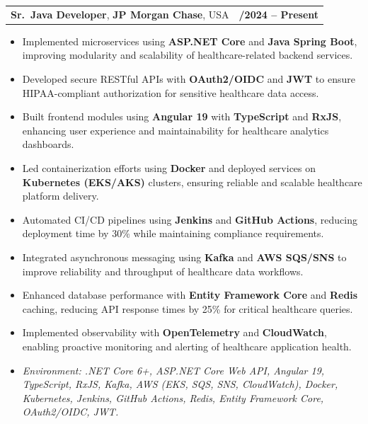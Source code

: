 \documentclass[letterpaper,11pt]{article}
\makeatletter
\newcommand{\resumeItem}[1]{
  \item\footnotesize{
    {#1 \vspace{-2pt}}
  }
}
\newcommand{\resumeSubheading}[4]{
  \vspace{-2pt}\item
    \begin{tabular*}{1.0\textwidth}[t]{l@{\extracolsep{\fill}}r}
      \textbf{\fontsize{10pt}{14pt}\selectfont #3}, \textbf{\fontsize{10pt}{14pt}\selectfont #1}, \fontsize{10pt}{14pt}\selectfont #4 & \textbf{\fontsize{10pt}{14pt}\selectfont #2} \\
    \end{tabular*}\vspace{-7pt}
}
\newcommand{\resumeItemListStart}{\begin{itemize}[leftmargin=*]}
\newcommand{\resumeItemListEnd}{\end{itemize}\vspace{-5pt}}
\makeatother
\begin{document}
\resumeSubheading
{JP Morgan Chase}{09/2024 -- Present}
{Sr.\ Java Developer}{USA}
\resumeItemListStart
  \resumeItem{Implemented microservices using \textbf{ASP.NET Core} and \textbf{Java Spring Boot}, improving modularity and scalability of healthcare-related backend services.}
  \resumeItem{Developed secure RESTful APIs with \textbf{OAuth2/OIDC} and \textbf{JWT} to ensure HIPAA-compliant authorization for sensitive healthcare data access.}
  \resumeItem{Built frontend modules using \textbf{Angular 19} with \textbf{TypeScript} and \textbf{RxJS}, enhancing user experience and maintainability for healthcare analytics dashboards.}
  \resumeItem{Led containerization efforts using \textbf{Docker} and deployed services on \textbf{Kubernetes (EKS/AKS)} clusters, ensuring reliable and scalable healthcare platform delivery.}
  \resumeItem{Automated CI/CD pipelines using \textbf{Jenkins} and \textbf{GitHub Actions}, reducing deployment time by 30\% while maintaining compliance requirements.}
  \resumeItem{Integrated asynchronous messaging using \textbf{Kafka} and \textbf{AWS SQS/SNS} to improve reliability and throughput of healthcare data workflows.}
  \resumeItem{Enhanced database performance with \textbf{Entity Framework Core} and \textbf{Redis} caching, reducing API response times by 25\% for critical healthcare queries.}
  \resumeItem{Implemented observability with \textbf{OpenTelemetry} and \textbf{CloudWatch}, enabling proactive monitoring and alerting of healthcare application health.}
  \resumeItem{\textit{Environment: .NET Core 6+, ASP.NET Core Web API, Angular 19, TypeScript, RxJS, Kafka, AWS (EKS, SQS, SNS, CloudWatch), Docker, Kubernetes, Jenkins, GitHub Actions, Redis, Entity Framework Core, OAuth2/OIDC, JWT.}}
\resumeItemListEnd
\end{document}
